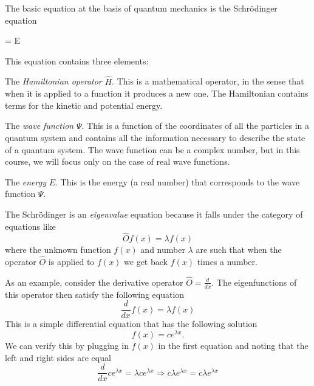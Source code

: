 \documentclass[../Main/notes.tex]{subfiles}
\begin{document}
The basic equation at the basis of quantum mechanics is the Schr\"{o}dinger equation
\begin{iequation}
\Psi = E \Psi
\end{iequation}
This equation contains three elements:
\begin{myitems}
\item The \emph{Hamiltonian operator} $\hat{H}$. This is a mathematical operator, in the sense that when it is applied to a function it produces a new one. The Hamiltonian contains terms for the kinetic and potential energy.
\item The \emph{wave function} $\Psi$. This is a function of the coordinates of all the particles in a quantum system and contains all the information necessary to describe the state of a quantum system.
The wave function can be a complex number, but in this course, we will focus only on the case of real wave functions.
\item The \emph{energy} $E$. This is the energy (a real number) that corresponds to the wave function $\Psi$.
\end{myitems}
The Schr\"{o}dinger is an \emph{eigenvalue} equation because it falls under the category of equations like
\begin{equation}
\hat{O} f(x) = \lambda f(x)
\end{equation}
where the unknown function $f(x)$ and number $\lambda$ are such that when the operator $\hat{O}$ is applied to $f(x)$ we get back $f(x)$ times a number.
\begin{example}
As an example, consider the derivative operator $\hat{O} = \frac{d}{dx}$.
The eigenfunctions of this operator then satisfy the following equation
\begin{equation}
\frac{d}{dx} f(x) = \lambda f(x)
\end{equation}
This is a simple differential equation that has the following solution
\begin{equation}
f(x) = c e^{\lambda x}.
\end{equation}
We can verify this by plugging in $f(x)$ in the first equation and noting that the left and right sides are equal
\begin{equation}
\frac{d}{dx} c e^{\lambda x} = \lambda c e^{\lambda x} \Rightarrow 
c \lambda e^{\lambda x} = c \lambda e^{\lambda x} 
\end{equation}
\end{example}
\end{document}

